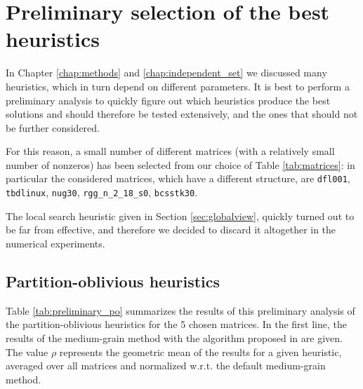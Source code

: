 \section{Preliminary selection of the best heuristics} \label{sec:preliminary_tests}

In Chapter \ref{chap:methods} and \ref{chap:independent_set} we discussed many heuristics, which in turn depend on different parameters. It is best to perform a preliminary analysis to quickly figure out which heuristics produce the best solutions and should therefore be tested extensively, and the ones that should not be further considered.

For this reason, a small number of different matrices (with a relatively small number of nonzeros) has been selected from our choice of Table \ref{tab:matrices}: in particular the considered matrices, which have a different structure, are \verb|dfl001|, \verb|tbdlinux|, \verb|nug30|, \verb|rgg_n_2_18_s0|, \verb|bcsstk30|.

The local search heuristic given in Section \ref{sec:globalview}, quickly turned out to be far from effective, and therefore we decided to discard it altogether in the numerical experiments.


\subsection{Partition-oblivious heuristics} \label{sec:preliminary_po}

Table \ref{tab:preliminary_po} summarizes the results of this preliminary analysis of the partition-oblivious heuristics for the 5 chosen matrices. In the first line, the results of the medium-grain method with the algorithm proposed in \cite{mediumgrain} are given. The value $\rho$ represents the geometric mean of the results for a given heuristic, averaged over all matrices and normalized w.r.t. the default medium-grain method.

